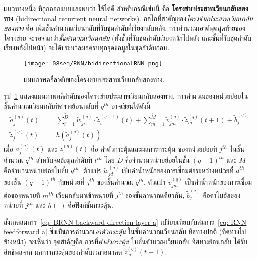 แนวทางหนึ่ง ที่ถูกออกแบบและพบว่า\cite{Graves2012} ใช้ได้ดี
สำหรับกรณีเช่นนี้
คือ \textbf{โครงข่ายประสาทเวียนกลับสองทาง} (bidirectional recurrent neural networks\cite{SchusterPaliwal1997}).
กลไกที่สำคัญของ\textit{โครงข่ายประสาทเวียนกลับสองทาง}
คือ เพิ่มชั้นคำนวณเวียนกลับที่รับชุดลำดับที่เรียงกลับหลัง.
การคำนวณเอาต์พุตสุดท้ายของโครงข่าย จะรอจนกว่า\textit{ชั้นคำนวณเวียนกลับ} (ทั้งชั้นที่รับชุดลำดับเรียงหน้าไปหลัง และชั้นที่รับชุดลำดับเรียงหลังไปหน้า) 
จะได้ประมวลผลครบทุกจุดข้อมูลในชุดลำดับก่อน.

\begin{figure}
	\begin{center}		
		\texttt{[image: 08seq/RNN/bidirectionalRNN.png]}	
		\caption[แผนภาพคลี่ลำดับของโครงข่ายประสาทเวียนกลับสองทาง]{แผนภาพคลี่ลำดับของโครงข่ายประสาทเวียนกลับสองทาง.
		}
		\label{fig: rnn unfolding diagram BRNN}
	\end{center}
\end{figure}
%

รูป~\ref{fig: rnn unfolding diagram BRNN} แสดงแผนภาพคลี่ลำดับของโครงข่ายประสาทเวียนกลับสองทาง.
การคำนวณของหน่วยย่อยในชั้นคำนวณเวียนกลับทิศทางย้อนกลับที่ $q^{th}$ อาจเขียนได้ดังนี้
\begin{eqnarray}
\tilde{a}_j^{(q)}(t) 
&=& \sum_{i=1}^{\tilde{D}} \tilde{w}_{ji}^{(q)} \cdot \tilde{z}_{i}^{(q-1)}(t) + \sum_{m=1}^{\tilde{M}} \tilde{v}_{jm}^{(q)} \cdot \tilde{z}_m^{(q)}(t+1) + \tilde{b}_j^{(q)}
\label{eq: BRNN backward direction layer a} \\
\tilde{z}_j^{(q)}(t) &=& h(\tilde{a}_j^{(q)}(t))
\label{eq: BRNN backward direction layer z}
\end{eqnarray}
เมื่อ $\tilde{a}_j^{(q)}(t)$
และ $\tilde{z}_j^{(q)}(t)$
คือ
ค่าตัวกระตุ้นและผลการกระตุ้น
ของหน่วยย่อยที่ $j^{th}$ 
ในชั้นคำนวณ $q^{th}$
สำหรับจุดข้อมูลลำดับที่ $t^{th}$
โดย $\tilde{D}$ คือจำนวนหน่วยย่อยในชั้น $(q-1)^{th}$
และ $\tilde{M}$ คือจำนวนหน่วยย่อยในชั้น $q^{th}$.
ตัวแปร $\tilde{w}_{jd}^{(q)}$ เป็นค่าน้ำหนักของการเชื่อมต่อระหว่างหน่วยที่ $d^{th}$ ของชั้น $(q-1)^{th}$ กับหน่วยที่ $j^{th}$ ของชั้นคำนวณ $q^{th}$.
ตัวแปร $\tilde{v}_{jm}^{(q)}$ เป็นค่าน้ำหนักของการเชื่อมต่อของหน่วยที่ $m^{th}$ เวียนกลับมาเข้าหน่วยที่ $j^{th}$ ของชั้นคำนวณเดียวกัน,
$\tilde{b}_j^{(q)}$ คือค่าไบอัสของหน่วยที่ $j^{th}$
และ $h(\cdot)$ คือฟังก์ชันกระตุ้น.

สังเกตสมการ~\ref{eq: BRNN backward direction layer a}
เปรียบเทียบกับสมการ~\ref{eq: RNN feedforward a} 
ซึ่งเป็นการคำนวณ\textit{ค่าตัวกระตุ้น} ในชั้นคำนวณเวียนกลับ ทิศทางปกติ (ทิศทางไปข้างหน้า)
จะเห็นว่า
จุดสำคัญคือ
การที่\textit{ค่าตัวกระตุ้น} ในชั้นคำนวณเวียนกลับ ทิศทางย้อนกลับ ได้รับอิทธิพลจาก ผลการกระตุ้นของลำดับเวลาอนาคต $\tilde{z}_m^{(q)}(t+1)$.

